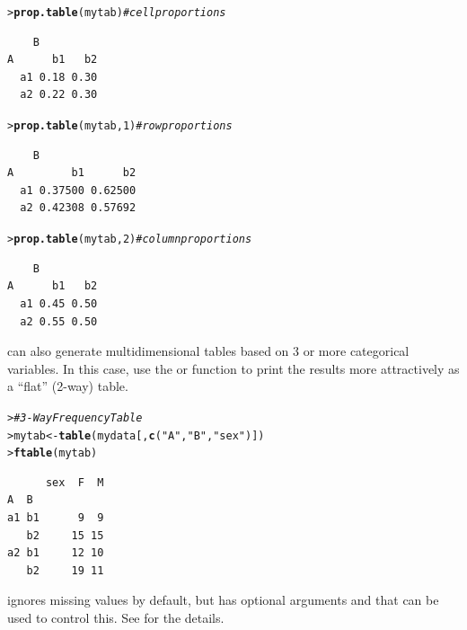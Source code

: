 \documentclass[10pt,krantz2]{krantz}\usepackage[]{graphicx}\usepackage[]{color}
\makeatletter
\newcommand{\hlnum}[1]{\textcolor[rgb]{0.686,0.059,0.569}{#1}}%
\newcommand{\hlstr}[1]{\textcolor[rgb]{0.192,0.494,0.8}{#1}}%
\newcommand{\hlcom}[1]{\textcolor[rgb]{0.678,0.584,0.686}{\textit{#1}}}%
\newcommand{\hlstd}[1]{\textcolor[rgb]{0.345,0.345,0.345}{#1}}%
\newcommand{\hlkwb}[1]{\textcolor[rgb]{0.69,0.353,0.396}{#1}}%
\newcommand{\hlkwd}[1]{\textcolor[rgb]{0.737,0.353,0.396}{\textbf{#1}}}%
\newenvironment{kframe}{%
 \def\at@end@of@kframe{}%
 \ifinner\ifhmode%
  \def\at@end@of@kframe{\end{minipage}}%
  \begin{minipage}{\columnwidth}%
 \fi\fi%
 \def\FrameCommand##1{\hskip\@totalleftmargin \hskip-\fboxsep
 \colorbox{shadecolor}{##1}\hskip-\fboxsep
     \hskip-\linewidth \hskip-\@totalleftmargin \hskip\columnwidth}%
 \MakeFramed {\advance\hsize-\width
   \@totalleftmargin\z@ \linewidth\hsize
   \@setminipage}}%
 {\par\unskip\endMakeFramed%
 \at@end@of@kframe}
\newenvironment{knitrout}{}{} %
\renewenvironment{knitrout}{\small\renewcommand{\baselinestretch}{.85}}{} %
\makeatother
\begin{document}
\begin{knitrout}
\color{fgcolor}\begin{kframe}
\begin{alltt}
\hlstd{> }\hlkwd{prop.table}\hlstd{(mytab)}        \hlcom{# cell proportions}
\end{alltt}
\begin{verbatim}
    B
A      b1   b2
  a1 0.18 0.30
  a2 0.22 0.30
\end{verbatim}
\begin{alltt}
\hlstd{> }\hlkwd{prop.table}\hlstd{(mytab,} \hlnum{1}\hlstd{)}     \hlcom{# row proportions}
\end{alltt}
\begin{verbatim}
    B
A         b1      b2
  a1 0.37500 0.62500
  a2 0.42308 0.57692
\end{verbatim}
\begin{alltt}
\hlstd{> }\hlkwd{prop.table}\hlstd{(mytab,} \hlnum{2}\hlstd{)}     \hlcom{# column proportions}
\end{alltt}
\begin{verbatim}
    B
A      b1   b2
  a1 0.45 0.50
  a2 0.55 0.50
\end{verbatim}
\end{kframe}
\end{knitrout}

 can  also  generate  multidimensional  tables  based  on  3  or  more
categorical variables. In  this case, use  the   or 
function to print the
results more attractively as a ``flat'' (2-way) table.


\begin{knitrout}
\color{fgcolor}\begin{kframe}
\begin{alltt}
\hlstd{> }\hlcom{# 3-Way Frequency Table}
\hlstd{> }\hlstd{mytab} \hlkwb{<-} \hlkwd{table}\hlstd{(mydata[,}\hlkwd{c}\hlstd{(}\hlstr{"A"}\hlstd{,} \hlstr{"B"}\hlstd{,} \hlstr{"sex"}\hlstd{)])}
\hlstd{> }\hlkwd{ftable}\hlstd{(mytab)}
\end{alltt}
\begin{verbatim}
      sex  F  M
A  B           
a1 b1      9  9
   b2     15 15
a2 b1     12 10
   b2     19 11
\end{verbatim}
\end{kframe}
\end{knitrout}
  ignores missing values by default, but has optional arguments
 and  that can be used to control this.
See  for the details.
\end{document}
